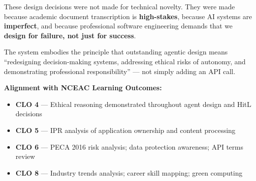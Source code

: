 \documentclass[12pt,a4paper]{article}
\begin{document}
These design decisions were not made for technical novelty. They were made because academic
document transcription is \textbf{high-stakes}, because AI systems are \textbf{imperfect}, and
because professional software engineering demands that we \textbf{design for failure, not just
for success}.

The system embodies the principle that outstanding agentic design means ``redesigning
decision-making systems, addressing ethical risks of autonomy, and demonstrating professional
responsibility'' — not simply adding an API call.

\vspace{1cm}
\begin{successbox}
\textbf{Alignment with NCEAC Learning Outcomes:}
\begin{itemize}[noitemsep]
  \item \textbf{CLO 4} — Ethical reasoning demonstrated throughout agent design and HitL
    decisions
  \item \textbf{CLO 5} — IPR analysis of application ownership and content processing
  \item \textbf{CLO 6} — PECA 2016 risk analysis; data protection awareness; API terms review
  \item \textbf{CLO 8} — Industry trends analysis; career skill mapping; green computing
\end{itemize}
\end{successbox}
\end{document}
